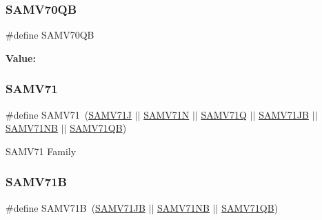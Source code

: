 \subsubsection{\texorpdfstring{SAMV70QB}{SAMV70QB}}
{\footnotesize\ttfamily \#define S\+A\+M\+V70\+QB}

{\bfseries Value\+:}
\begin{DoxyCode}{0}
\DoxyCodeLine{( \(\backslash\)}
\DoxyCodeLine{    )}

\end{DoxyCode}
\mbox{\label{group__sam__part__macros__group_ga3244695e750cd101d85bdfbc8802c5e9}} 
\subsubsection{\texorpdfstring{SAMV71}{SAMV71}}
{\footnotesize\ttfamily \#define S\+A\+M\+V71~(\mbox{\hyperlink{group__sam__part__macros__group_gaec1e3ef31d457e77f20063cdde7e13b9}{S\+A\+M\+V71J}} $\vert$$\vert$ \mbox{\hyperlink{group__sam__part__macros__group_ga8688ea299fbe00f831b4e569cf1c742c}{S\+A\+M\+V71N}} $\vert$$\vert$ \mbox{\hyperlink{group__sam__part__macros__group_ga1abe2ffaaf3eebef08978f55ed456a5c}{S\+A\+M\+V71Q}} $\vert$$\vert$ \mbox{\hyperlink{group__sam__part__macros__group_ga4fbb0bc9ffb5be011f7aa7eeb9e8dd4b}{S\+A\+M\+V71\+JB}} $\vert$$\vert$ \mbox{\hyperlink{group__sam__part__macros__group_gaf052dd0a36916f7370105b557d9c2fa8}{S\+A\+M\+V71\+NB}} $\vert$$\vert$ \mbox{\hyperlink{group__sam__part__macros__group_gaa2f5f7f21d9a40bcd31df4ef38838059}{S\+A\+M\+V71\+QB}})}

S\+A\+M\+V71 Family \mbox{\label{group__sam__part__macros__group_ga17a0c9d79f8d9127113f29823538db02}} 
\subsubsection{\texorpdfstring{SAMV71B}{SAMV71B}}
{\footnotesize\ttfamily \#define S\+A\+M\+V71B~(\mbox{\hyperlink{group__sam__part__macros__group_ga4fbb0bc9ffb5be011f7aa7eeb9e8dd4b}{S\+A\+M\+V71\+JB}} $\vert$$\vert$ \mbox{\hyperlink{group__sam__part__macros__group_gaf052dd0a36916f7370105b557d9c2fa8}{S\+A\+M\+V71\+NB}} $\vert$$\vert$ \mbox{\hyperlink{group__sam__part__macros__group_gaa2f5f7f21d9a40bcd31df4ef38838059}{S\+A\+M\+V71\+QB}})}

